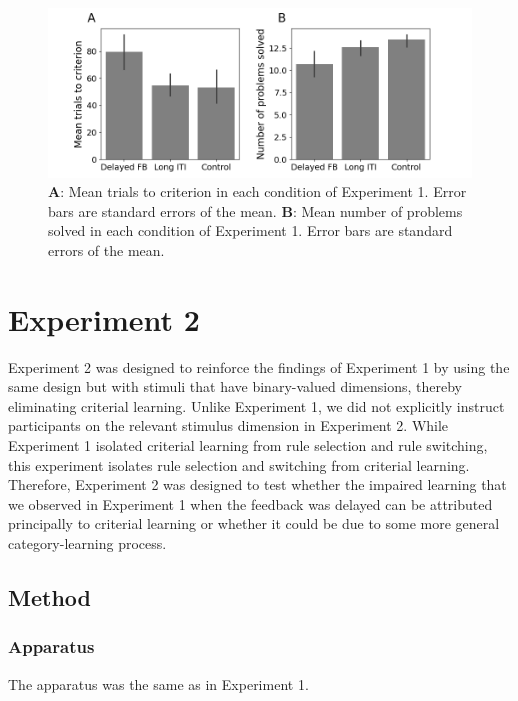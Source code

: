 \documentclass[doc, floatsintext]{apa7}
\begin{document}
\begin{figure}
  \centering
  \includegraphics[width=.8\textwidth]{../figures/fig_exp_1_t2c.png}
    \caption{
        \textbf{A}: Mean trials to criterion in each
        condition of Experiment 1. Error bars are standard
        errors of the mean.
        \textbf{B}: Mean number of problems solved in each
        condition of Experiment 1. Error bars are standard
        errors of the mean.
}
  \label{fig_exp_1_t2c}
\end{figure}

\section{Experiment 2}
Experiment 2 was designed to reinforce the findings of
Experiment 1 by using the same design but with stimuli that
have binary-valued dimensions, thereby eliminating criterial
learning. Unlike Experiment 1, we did not explicitly
instruct participants on the relevant stimulus dimension in
Experiment 2.  While Experiment 1 isolated criterial
learning from rule selection and rule switching, this
experiment isolates rule selection and switching from
criterial learning. Therefore, Experiment 2 was designed to
test whether the impaired learning that we observed in
Experiment 1 when the feedback was delayed can be attributed
principally to criterial learning or whether it could be due
to some more general category-learning process.

\subsection{Method}

\subsubsection{Apparatus}
The apparatus was the same as in Experiment 1.
\end{document}
